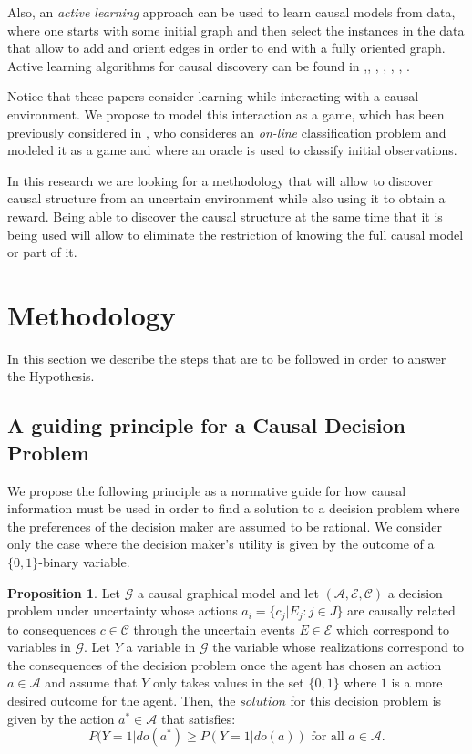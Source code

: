 \documentclass[english,letterpaper,12pt,final]{article}
\theoremstyle{definition}
\newtheorem{prop}{Proposition}[section]
\begin{document}
Also, an \textit{active learning} approach can be used to learn causal models from data, where one starts with some initial graph and then select the instances in the data that allow to add and orient edges in order to end with a fully oriented graph. Active learning algorithms for causal discovery can be found in \cite{tong2001active},\cite{murphy2001active}, \cite{meganck2006learning}, \cite{he2008active}, \cite{hauser2012two}, \cite{10.1007/978-3-319-56970-3_9}, \cite{rubenstein2017probabilistic}.

Notice that these papers consider learning while interacting with a causal environment. We propose to model this interaction as a game, which has been previously considered in \cite{werling2015job}, who consideres an \textit{on-line} classification problem and modeled it as a game and where an oracle is used to classify initial observations.

In this research we are looking for a methodology that will allow to discover causal structure from an uncertain environment while also using it to obtain a reward. Being able to discover the causal structure at the same time that it is being used will allow to eliminate the restriction of knowing the full causal model or part of it. 
\newpage
\section{Methodology}
In this section we describe the steps that are to be followed in order to answer the Hypothesis.
\subsection{A guiding principle for a Causal Decision Problem}
We propose the following principle as a normative guide for how causal information must be used in order to find a solution to a decision problem where the preferences of the decision maker are assumed to be rational. We consider only the case where the decision maker's utility is given by the outcome of a $\{0,1 \}$-binary variable.
\begin{prop}
Let  $\mathcal{G}$ a causal graphical model and let $(\mathcal{A},\mathcal{E},\mathcal{C})$ a decision problem under uncertainty whose actions $a_i = \{ c_j | E_j : j \in J \}$  are causally related to consequences $c \in \mathcal{C}$ through the uncertain events $E \in \mathcal{E}$ which correspond to variables in $\mathcal{G}$. Let $Y$ a variable in $\mathcal{G}$ the variable whose realizations correspond to the consequences of the decision problem once the agent has chosen an action $a \in \mathcal{A}$ and assume that $Y$ only takes values in the set $\{ 0,1\}$ where $1$ is a more desired outcome for the agent. Then, the $\textit{solution}$ for this decision problem is given by the action $a^\ast \in \mathcal{A}$ that satisfies:
\[ P(Y=1 | do(a^\ast) \geq P(Y=1 | do(a)) \textrm{ for all } a \in \mathcal{A}. \]
\end{prop}
\end{document}
